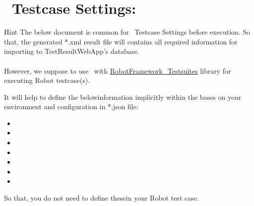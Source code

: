 



\hypertarget{description-robotframework-testcase-settings}{%
\section{\rfwcore\ Testcase Settings:}
\label{description-robotframework-testcase-settings}}

\begin{boxhint} {Hint}
  The below document is common for \rfwcore\ Testcase Settings before execution.
  So that, the generated *.xml result file will contains all required 
  information for importing to TestResultWebApp's database.\\
  \\
  However, we suppose to use \rfw\ with 
  \href{https://github.com/test-fullautomation/robotframework-testsuitesmanagement}{RobotFramework\_Testsuites}
  library for executing Robot testcase(s).

  It will help to define the belowinformation implicitly within 
  the  bases on your environment and configuration in *.json 
  file:
  \begin{itemize}
    \item {}
    \item {}
    \item {}
    \item {}
    \item {}
    \item {}
    \item {}
  \end{itemize}

  So that, you do not need to define thesein your Robot test case.
\end{boxhint}

